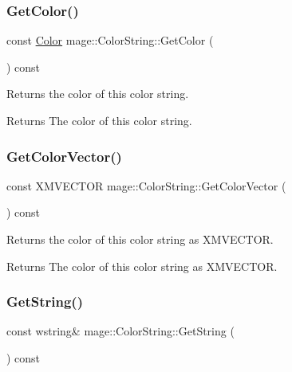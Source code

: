\subsubsection{\texorpdfstring{Get\+Color()}{GetColor()}}
{\footnotesize\ttfamily const \hyperlink{structmage_1_1_color}{Color} mage\+::\+Color\+String\+::\+Get\+Color (\begin{DoxyParamCaption}{ }\end{DoxyParamCaption}) const}

Returns the color of this color string.

\begin{DoxyReturn}{Returns}
The color of this color string. 
\end{DoxyReturn}
\hypertarget{structmage_1_1_color_string_a373ca6121d99156daa4aa636920d0cc2}{}\label{structmage_1_1_color_string_a373ca6121d99156daa4aa636920d0cc2} 
\subsubsection{\texorpdfstring{Get\+Color\+Vector()}{GetColorVector()}}
{\footnotesize\ttfamily const X\+M\+V\+E\+C\+T\+OR mage\+::\+Color\+String\+::\+Get\+Color\+Vector (\begin{DoxyParamCaption}{ }\end{DoxyParamCaption}) const}

Returns the color of this color string as {\ttfamily X\+M\+V\+E\+C\+T\+OR}.

\begin{DoxyReturn}{Returns}
The color of this color string as {\ttfamily X\+M\+V\+E\+C\+T\+OR}. 
\end{DoxyReturn}
\hypertarget{structmage_1_1_color_string_a9789c8bfac1667f0ee624351c45b2177}{}\label{structmage_1_1_color_string_a9789c8bfac1667f0ee624351c45b2177} 
\subsubsection{\texorpdfstring{Get\+String()}{GetString()}}
{\footnotesize\ttfamily const wstring\& mage\+::\+Color\+String\+::\+Get\+String (\begin{DoxyParamCaption}{ }\end{DoxyParamCaption}) const}

